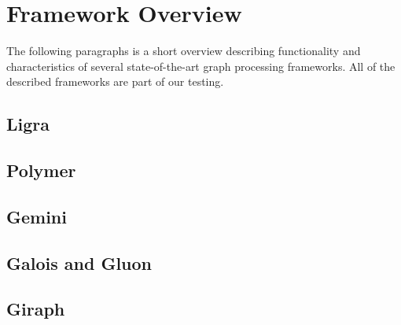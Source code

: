 
\section{Framework Overview}
The following paragraphs is a short overview describing functionality and characteristics of several state-of-the-art graph processing frameworks.
All of the described frameworks are part of our testing.
\todo

\subsection{Ligra}


\subsection{Polymer}


\subsection{Gemini}


\subsection{Galois and Gluon}


\subsection{Giraph}





